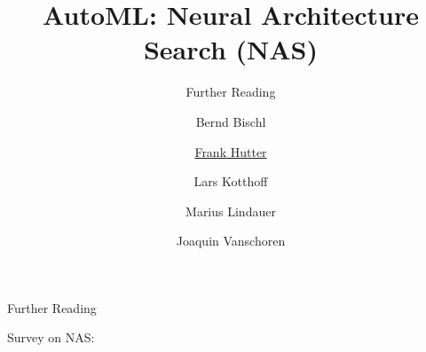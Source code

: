 

\title[AutoML: NAS]{AutoML: Neural Architecture Search (NAS)} 
\subtitle{Further Reading}
\author[Marius Lindauer]{Bernd Bischl \and \underline{Frank Hutter} \and Lars Kotthoff\newline \and Marius Lindauer \and Joaquin Vanschoren}
\institute{}
\date{}


\maketitle

\begin{frame}[c]{Further Reading}

Survey on NAS:     

\end{frame}
